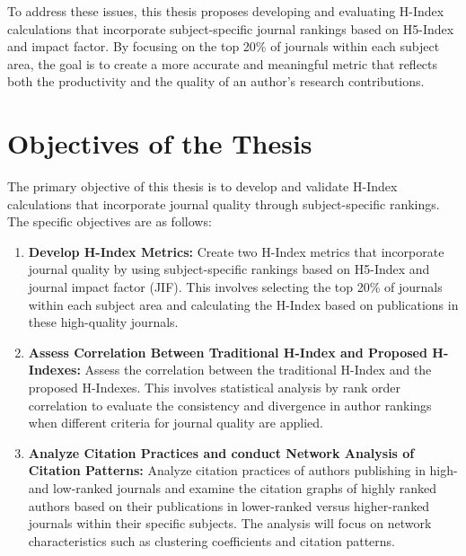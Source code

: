 To address these issues, this thesis proposes developing and evaluating H-Index
calculations that incorporate subject-specific journal rankings based on
H5-Index and impact factor. By focusing on the top 20\% of journals within each
subject area, the goal is to create a more accurate and meaningful metric that
reflects both the productivity and the quality of an author's research
contributions.

\section{Objectives of the Thesis}
The primary objective of this thesis is to develop and validate H-Index
calculations that incorporate journal quality through subject-specific
rankings. The specific objectives are as follows:
\begin{enumerate}
      \item \textbf{Develop H-Index Metrics:} Create two H-Index metrics that incorporate journal quality
            by using subject-specific rankings based on H5-Index and journal impact factor (JIF).
            This involves selecting the top 20\% of journals within each subject area and calculating the H-Index based on publications
            in these high-quality journals.
      \item \textbf{Assess Correlation Between Traditional H-Index and Proposed H-Indexes:} Assess the correlation between the traditional H-Index
            and the proposed H-Indexes. This involves statistical analysis by rank order correlation
            to evaluate the consistency and divergence in author rankings when different criteria for journal quality are applied.
      \item \textbf{Analyze Citation Practices and conduct Network Analysis of Citation Patterns:} Analyze citation practices of authors publishing in high- and low-ranked journals
            and examine the citation graphs of highly ranked authors based on their publications in lower-ranked versus
            higher-ranked journals within their specific subjects. The analysis will focus on network characteristics such as
            clustering coefficients and citation patterns. %

\end{enumerate}
